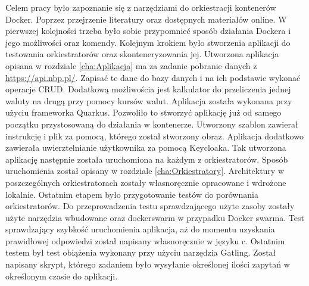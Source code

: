 \documentclass{iiuwb}
\begin{document}

Celem pracy było zapoznanie się z narzędziami do orkiestracji 
kontenerów Docker. Poprzez przejrzenie literatury oraz dostępnych 
materiałów online. W pierwszej kolejności trzeba było sobie 
przypomnieć sposób działania Dockera i jego możliwości oraz komendy. 
Kolejnym krokiem było stworzenia aplikacji do testowania 
orkiestratorów oraz skonteneryzowania jej. Utworzona aplikacja 
opisana w rozdziale \ref{cha:Aplikacja} ma za zadanie pobranie danych 
z \url{https://api.nbp.pl/}. Zapisać te dane do bazy danych i na 
ich podstawie wykonać operacje CRUD. Dodatkową możliwościa jest 
kalkulator do przeliczenia jednej waluty na drugą przy pomocy kursów 
walut. Aplikacja została wykonana przy użyciu frameworka Quarkus. 
Pozwoliło to stworzyć aplikację już od samego początku przystosowaną 
do działania w kontenerze. Utworzony szablon zawierał instrukcję i plik 
za pomocą, którego został stworzony obraz. Aplikacja dodatkowo zawierała 
uwierztelnianie użytkownika za pomocą Keycloaka. Tak utworzona aplikację 
następnie została uruchomiona na każdym z orkiestratorów. Sposób 
uruchomienia został opisany w rozdziale \ref{cha:Orkiestratory}. 
Architektury w poszczególnych orkiestratorach zostały własnoręcznie 
opracowane i wdrożone lokalnie. Ostatnim etapem było przygotowanie 
testów do porównania orkiestratorów. Do przeprowadzenia testu 
sprawdzającego użyte zasoby zostały użyte narzędzia wbudowane 
oraz dockerswarm w przypadku Docker swarma. Test sprawdzający 
szybkość uruchomienia aplikacja, aż do momentu uzyskania prawidłowej 
odpowiedzi został napisany własnoręcznie w języku c. Ostatnim testem 
był test obiążenia wykonany przy użyciu narzędzia Gatling. Został 
napisany skrypt, którego zadaniem było wysyłanie określonej ilości 
zapytań w określonym czasie do aplikacji. 
\newline

\end{document}
